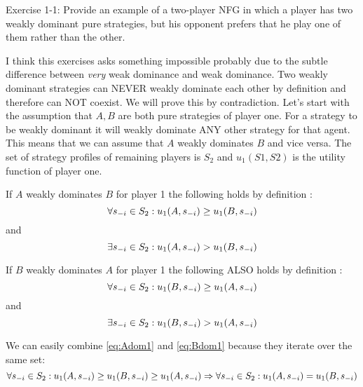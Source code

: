 \documentclass[../main.tex]{subfiles}
\begin{document}
\begin{question}
    Exercise 1-1: Provide an example of a two-player NFG in which a player has two weakly dominant pure strategies, but his opponent prefers that he play one of them rather than the other.
\end{question}

\begin{solution}
	\label{twoweak}
	I think this exercises asks something impossible probably due to the subtle difference between \emph{very} weak dominance and weak dominance.
	Two weakly dominant strategies can NEVER weakly dominate each other by definition and therefore can NOT coexist.
	We will prove this by contradiction.
	Let's start with the assumption that $A,B$ are both pure strategies of player one.
	For a strategy to be weakly dominant it will weakly dominate ANY other strategy for that agent.
	This means that we can assume that $A$ weakly dominates $B$ and vice versa.
	The set of strategy profiles of remaining players is $S_2$ and $u_1(S1,S2)$ is the utility function of player one.

	If $A$ weakly dominates $B$ for player 1 the following holds by definition :
	\begin{equation}
		\label{eq:Adom1}
		\forall s_{\--i} \in S_2 : u_1(A,s_{\--i}) \geq u_1(B,s_{\--i})
	\end{equation}
	and
	\begin{equation}
		\label{eq:Adom2}
		\exists s_{\--i} \in S_2 : u_1(A,s_{\--i}) > u_1(B,s_{\--i})
	\end{equation}

	If $B$ weakly dominates $A$ for player 1 the following ALSO holds by definition :
	\begin{equation}
		\label{eq:Bdom1}
		\forall s_{\--i} \in S_2 : u_1(B,s_{\--i}) \geq u_1(A,s_{\--i})
	\end{equation}
	and
	\begin{equation}
		\label{eq:Bdom2}
		\exists s_{\--i} \in S_2 : u_1(B,s_{\--i}) > u_1(A,s_{\--i})
	\end{equation}

	We can easily combine \autoref{eq:Adom1} and \autoref{eq:Bdom1} because they iterate over the same set:
	\begin{equation}
		\label{eq:equal}
		\forall s_{\--i} \in S_2 : u_1(A,s_{\--i}) \geq u_1(B,s_{\--i}) \geq u_1(A,s_{\--i}) \\ \Rightarrow \forall s_{\--i} \in S_2 :  u_1(A,s_{\--i}) = u_1(B,s_{\--i})
	\end{equation}


\end{solution}
\end{document}
